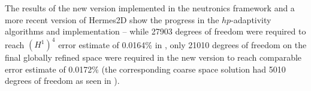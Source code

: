 The results of the new version implemented in the neutronics
framework and a more recent version of Hermes2D show the progress in the $hp$-adaptivity algorithms and
implementation -- while 27903 degrees of freedom were required to reach $(H^1)^4$ error estimate of 0.0164\% in
\cite{Hermes-nuclear}, only 21010 degrees of freedom on the final globally refined space were required in the new
version to reach comparable error estimate of 0.0172\% (the corresponding coarse space solution had 5010 degrees of
freedom as seen in ).

\begin{figure}[!ht]
\centering
{}
\hspace{.5em}
\end{figure}
